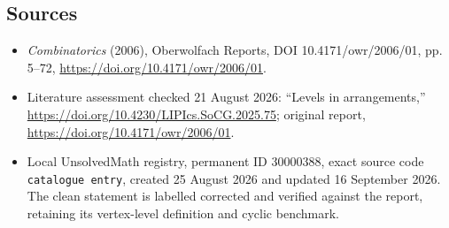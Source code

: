 \documentclass[11pt]{article}
\begin{document}
\subsection{Sources}
\begin{itemize}
\item \emph{Combinatorics} (2006), Oberwolfach Reports, DOI 10.4171/owr/2006/01, pp. 5--72, \url{https://doi.org/10.4171/owr/2006/01}.
\item Literature assessment checked 21 August 2026: ``Levels in arrangements,'' \url{https://doi.org/10.4230/LIPIcs.SoCG.2025.75}; original report, \url{https://doi.org/10.4171/owr/2006/01}.
\item Local UnsolvedMath registry, permanent ID $30000388$, exact source code \texttt{catalogue entry}, created 25 August 2026 and updated 16 September 2026. The clean statement is labelled corrected and verified against the report, retaining its vertex-level definition and cyclic benchmark.
\end{itemize}
\end{document}

